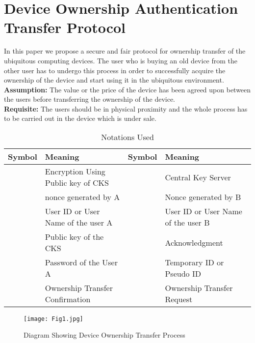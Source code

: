 \documentclass[letterpaper]{article}
\begin{document}
\section{Device Ownership Authentication Transfer Protocol}
\label{a}
In this paper we propose a secure and fair protocol for ownership transfer of the ubiquitous computing devices. The user who is buying an old device from the other user has to undergo this process in order to successfully acquire the ownership of the device and start using it in the ubiquitous environment.\\

\textbf{Assumption:} The value or the price of the device has been agreed upon between the users before transferring the ownership of the device.\\

\textbf{Requisite:} The users should be in physical proximity and the whole process has to be carried out in the device which is under sale.

\begin{table*}[bpht!]
\centering
	\caption{Notations Used} 
	\label{tab}
\begin{tabular}{|c|p{2in}|c|p{1.5in}|}
	\hline 
	\textbf{Symbol}&\textbf{Meaning}&\textbf{Symbol}&\textbf{Meaning} \\ \hline 
	
	&Encryption Using Public key of CKS&&Central Key Server\\ \hline 
			&nonce generated by A& &Nonce generated by B \\ \hline
			&User ID or User Name of the user A&&User ID or User Name of the user B\\ \hline 
			&Public key of the CKS&& Acknowledgment\\ \hline
			&Password of the User A&& Temporary ID or Pseudo ID\\ \hline 
			&Ownership Transfer Confirmation&&Ownership Transfer Request\\ \hline
		  
	\end{tabular}
\end{table*}	 
 
\begin{figure}[bpht!]
\centering
\texttt{[image: Fig1.jpg]}
\caption{Diagram Showing Device Ownership Transfer Process}
\label{fig:1}
\end{figure}
\end{document}
